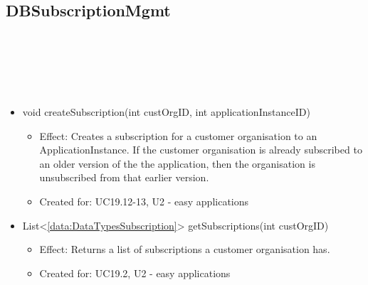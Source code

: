   \subsection{DBSubscriptionMgmt}\label{int:OtherDataDatabaseOtherDataDBDBSubscriptionMgmt}
    \begin{description}
      \item[Provided by:] \iconcomponent{}~
      \item[Required by:] \iconcomponent{}~
      \item[Operations:] ~
    \begin{itemize}[noitemsep,nolistsep,leftmargin=-.25cm]
      \item \textsf{void createSubscription(int custOrgID, int applicationInstanceID)}
        \begin{itemize}[noitemsep,nolistsep]
           \item Effect: Creates a subscription for a customer organisation to an ApplicationInstance. If the customer organisation is already subscribed to an older version of the the application, then the organisation is unsubscribed from that earlier version.
\item Created for: UC19.12-13, U2 - easy applications
        \end{itemize}
      \item \textsf{List\textless{}\ref{data:DataTypesSubscription}\textgreater{} getSubscriptions(int custOrgID)}
        \begin{itemize}[noitemsep,nolistsep]
           \item Effect: Returns a list of subscriptions a customer organisation has.
\item Created for: UC19.2, U2 - easy applications
        \end{itemize}
    \end{itemize}
    \end{description}

